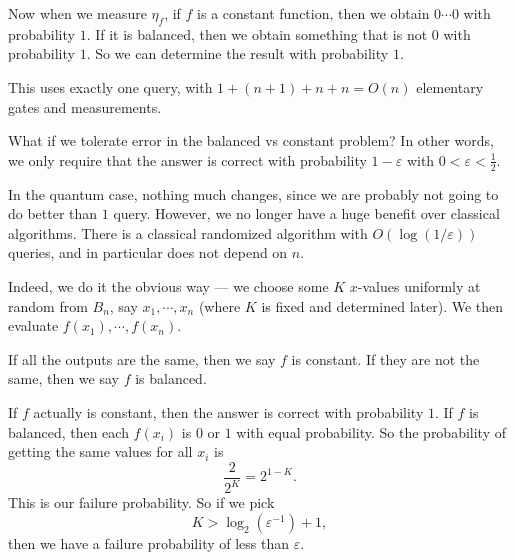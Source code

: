 \documentclass[a4paper]{article}
\makeatletter
\DeclareRobustCommand{\rvdots}{%
  \vbox{
    \baselineskip4\p@\lineskiplimit\z@
    \kern-\p@
    \hbox{.}\hbox{.}\hbox{.}
  }
}
\newcommand\addstate[3]{
  \pgfmathsetmacro{\y@y}{-#2 * 0.7};
  \pgfmathsetmacro{\x@x}{#3};
  \node [left] at (0, \y@y) {#1};
  \draw (0, \y@y) -- (\x@x, \y@y);
}
\newcommand\addoperator[3]{
  \node [draw, rectangle, fill=white] at (#3, -#2 * 0.7) {#1};
}
\newcommand\addbigoperator[5]{
  \pgfmathsetmacro{\y@s}{-#2 * 0.7 + 0.2};
  \pgfmathsetmacro{\y@t}{-#3 * 0.7 - 0.2};
  \pgfmathsetmacro{\x@s}{#4};
  \pgfmathsetmacro{\x@t}{#5};
  \pgfmathsetmacro{\x@c}{(\x@s + \x@t)/2};
  \pgfmathsetmacro{\y@c}{(\y@s + \y@t)/2};

  \draw [fill=white] (\x@s, \y@s) rectangle (\x@t, \y@t);
  \node at (\x@c, \y@c) {#1};
}
\newcommand{\qH}{\mathsf{H}}
\newcommand{\qX}{\mathsf{X}}
\makeatother
\begin{document}
Now when we measure $\eta_f$, if $f$ is a constant function, then we obtain $0\cdots0$ with probability $1$. If it is balanced, then we obtain something that is not $0$ with probability $1$. So we can determine the result with probability $1$.
\begin{center}
\end{center}
This uses exactly one query, with $1 + (n + 1) + n + n = O(n)$ elementary gates and measurements.

What if we tolerate error in the balanced vs constant problem? In other words, we only require that the answer is correct with probability $1 - \varepsilon$ with $0 < \varepsilon < \frac{1}{2}$.

In the quantum case, nothing much changes, since we are probably not going to do better than $1$ query. However, we no longer have a huge benefit over classical algorithms. There is a classical randomized algorithm with $O(\log(1/\varepsilon))$ queries, and in particular does not depend on $n$.

Indeed, we do it the obvious way --- we choose some $K$ $x$-values uniformly at random from $B_n$, say $x_1, \cdots, x_n$ (where $K$ is fixed and determined later). We then evaluate $f(x_1), \cdots, f(x_n)$.

If all the outputs are the same, then we say $f$ is constant. If they are not the same, then we say $f$ is balanced.

If $f$ actually is constant, then the answer is correct with probability $1$. If $f$ is balanced, then each $f(x_i)$ is $0$ or $1$ with equal probability. So the probability of getting the same values for all $x_i$ is
\[
  \frac{2}{2^K} = 2^{1 - K}.
\]
This is our failure probability. So if we pick
\[
  K > \log_2 (\varepsilon^{-1}) + 1,
\]
then we have a failure probability of less than $\varepsilon$.
\end{document}
